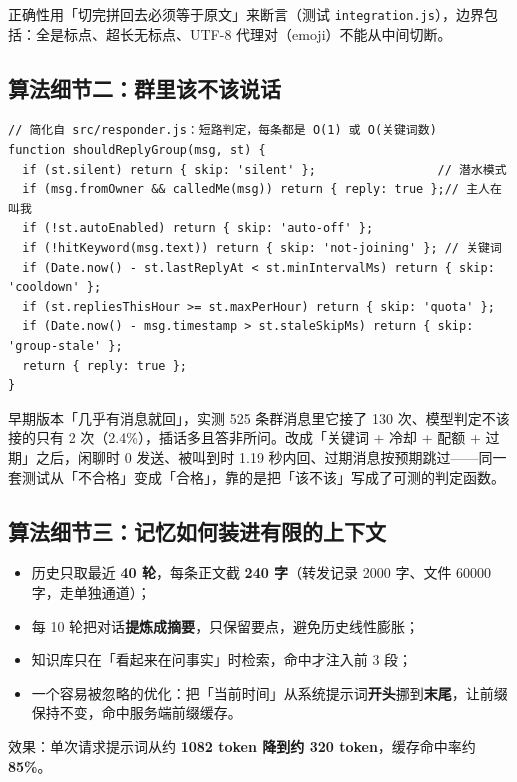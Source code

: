 \documentclass[11pt,a4paper]{ctexart}
\begin{document}
正确性用「切完拼回去必须等于原文」来断言（测试 \texttt{integration.js}），边界包括：全是标点、超长无标点、UTF-8 代理对（emoji）不能从中间切断。

\subsection{算法细节二：群里该不该说话}

\begin{lstlisting}
// 简化自 src/responder.js：短路判定，每条都是 O(1) 或 O(关键词数)
function shouldReplyGroup(msg, st) {
  if (st.silent) return { skip: 'silent' };                 // 潜水模式
  if (msg.fromOwner && calledMe(msg)) return { reply: true };// 主人在叫我
  if (!st.autoEnabled) return { skip: 'auto-off' };
  if (!hitKeyword(msg.text)) return { skip: 'not-joining' }; // 关键词
  if (Date.now() - st.lastReplyAt < st.minIntervalMs) return { skip: 'cooldown' };
  if (st.repliesThisHour >= st.maxPerHour) return { skip: 'quota' };
  if (Date.now() - msg.timestamp > st.staleSkipMs) return { skip: 'group-stale' };
  return { reply: true };
}
\end{lstlisting}

早期版本「几乎有消息就回」，实测 525 条群消息里它接了 130 次、模型判定不该接的只有 2 次（2.4\%），插话多且答非所问。改成「关键词 + 冷却 + 配额 + 过期」之后，闲聊时 0 发送、被叫到时 1.19 秒内回、过期消息按预期跳过——同一套测试从「不合格」变成「合格」，靠的是把「该不该」写成了可测的判定函数。

\subsection{算法细节三：记忆如何装进有限的上下文}

\begin{itemize}[leftmargin=1.6em]
\item 历史只取最近 \textbf{40 轮}，每条正文截 \textbf{240 字}（转发记录 2000 字、文件 60000 字，走单独通道）；
\item 每 10 轮把对话\textbf{提炼成摘要}，只保留要点，避免历史线性膨胀；
\item 知识库只在「看起来在问事实」时检索，命中才注入前 3 段；
\item 一个容易被忽略的优化：把「当前时间」从系统提示词\textbf{开头}挪到\textbf{末尾}，让前缀保持不变，命中服务端前缀缓存。
\end{itemize}

效果：单次请求提示词从约 \textbf{1082 token 降到约 320 token}，缓存命中率约 \textbf{85\%}。
\end{document}
